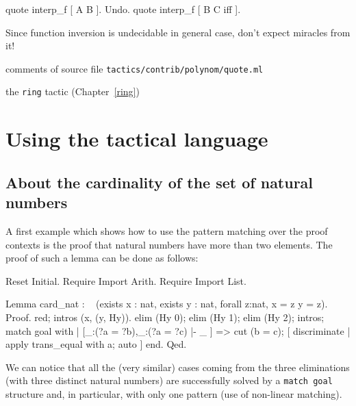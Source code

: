 \begin{coq_example}
quote interp_f [ A B ].
Undo.
  quote interp_f [ B C iff ].
\end{coq_example}

\Warning Since function inversion
is undecidable in general case, don't expect miracles from it!


\SeeAlso comments of source file \texttt{tactics/contrib/polynom/quote.ml}

\SeeAlso the \texttt{ring} tactic (Chapter~\ref{ring})



\section{Using the tactical language}

\subsection{About the cardinality of the set of natural numbers}

A first example which shows how to use the pattern matching over the proof
contexts is the proof that natural numbers have more than two elements. The
proof of such a lemma can be done as %
follows:
\begin{coq_eval}
Reset Initial.
Require Import Arith.
Require Import List.
\end{coq_eval}
\begin{coq_example*}
Lemma card_nat :
 ~ (exists x : nat, exists y : nat, forall z:nat, x = z \/ y = z).
Proof.
red; intros (x, (y, Hy)).
elim (Hy 0); elim (Hy 1); elim (Hy 2); intros;
 match goal with
 | [_:(?a = ?b),_:(?a = ?c) |- _ ] =>
     cut (b = c); [ discriminate | apply trans_equal with a; auto ]
 end.
Qed.
\end{coq_example*}

We can notice that all the (very similar) cases coming from the three
eliminations (with three distinct natural numbers) are successfully solved by
a {\tt match goal} structure and, in particular, with only one pattern (use
of non-linear matching).

